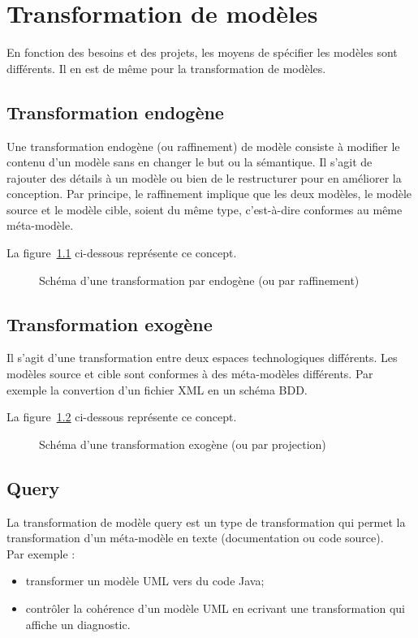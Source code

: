 \newpage
\chapter{Transformation de mod{\`e}les}

En fonction des besoins et des projets, les moyens de sp{\'e}cifier les mod{\`e}les sont diff{\'e}rents. Il en est de m{\^e}me pour la transformation de mod{\`e}les.

\section{Transformation endog{\`e}ne}
Une transformation endog{\`e}ne (ou raffinement) de mod{\`e}le consiste {\`a} modifier le contenu d'un mod{\`e}le sans en changer le but ou la s{\'e}mantique. Il s'agit de rajouter des d{\'e}tails {\`a} un mod{\`e}le ou bien de le restructurer pour en am{\'e}liorer la conception. Par principe, le raffinement implique que les deux mod{\`e}les, le mod{\`e}le source et le mod{\`e}le cible, soient du m{\^e}me type, c'est-{\`a}-dire conformes au m{\^e}me m{\'e}ta-mod{\`e}le.

\noindent La figure~\ref{raffinement} ci-dessous repr{\'e}sente ce concept.

\begin{figure}[!ht]
	\centering
	\caption{Sch{\'e}ma d'une transformation par endog{\`e}ne (ou par raffinement)}
	\label{raffinement}

\end{figure}

\section{Transformation exog{\`e}ne}
Il s'agit d'une transformation entre deux espaces technologiques diff{\'e}rents. Les mod{\`e}les source et cible sont conformes {\`a} des m{\'e}ta-mod{\`e}les diff{\'e}rents. Par exemple la convertion d'un fichier XML en un sch{\'e}ma BDD.

\noindent La figure~\ref{projection} ci-dessous repr{\'e}sente ce concept.

\begin{figure}[!ht]
	\centering
	\caption{Sch{\'e}ma d'une transformation exog{\`e}ne (ou par projection)}
	\label{projection}

\end{figure}

\section{Query}
La transformation de mod{\`e}le query est un type de transformation qui permet la transformation d'un m{\'e}ta-mod{\`e}le en texte (documentation ou code source).\\
Par exemple :
\begin{itemize}
\item transformer un mod{\`e}le UML vers du code Java;
\item contr{\^o}ler la coh{\'e}rence d'un mod{\`e}le UML en ecrivant une transformation qui affiche un diagnostic.
\end{itemize}

